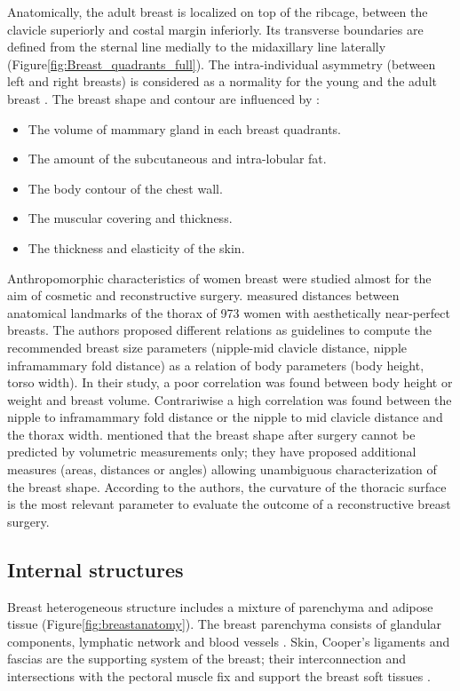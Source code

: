  Anatomically, the adult breast is localized on top of the ribcage, between the clavicle superiorly and costal margin inferiorly. Its transverse boundaries are defined from the sternal line medially to the midaxillary line laterally (Figure\ref{fig:Breast_quadrants_full}). The intra-individual asymmetry (between left and right breasts) is considered as a normality for the young and the adult breast . The breast shape and contour are influenced by \citep{mugea2014aesthetic}:
 \begin{itemize}
 \item The volume of mammary gland in each breast quadrants.
 \item The amount of the subcutaneous and intra-lobular fat.
 \item The body contour of the chest wall.
 \item The muscular covering and thickness.
 \item The thickness and elasticity of the skin.
 \end{itemize}

Anthropomorphic characteristics of women breast were studied almost for the aim of cosmetic and reconstructive surgery.  \cite{vandeput2002considerations} measured distances between anatomical landmarks of the thorax of 973 women with aesthetically near-perfect breasts. The authors proposed different relations as guidelines to compute the recommended breast size parameters (nipple-mid clavicle distance, nipple inframammary fold distance) as a relation of body parameters (body height, torso width). In their study, a poor correlation was found between body height or weight and breast volume. Contrariwise a high correlation was found between the nipple to  inframammary fold distance or the nipple to mid clavicle distance and the thorax width. \cite{catanuto2008experimental} mentioned that the breast shape after surgery cannot be predicted by volumetric measurements only; they have proposed additional measures (areas, distances or angles) allowing unambiguous characterization of the breast shape. According to the authors, the curvature of the thoracic surface is the most relevant parameter to evaluate the outcome of a reconstructive breast surgery.


\subsection{Internal structures}\label{subsection:internalstructures}

Breast heterogeneous structure includes a mixture of parenchyma and adipose tissue (Figure\ref{fig:breastanatomy}). The breast parenchyma consists of glandular components, lymphatic network and blood vessels \citep{clemente2011anatomy}. Skin, Cooper's ligaments and fascias are the supporting system of the breast; their interconnection and intersections with the pectoral muscle fix and support the breast soft tissues \citep{mugea2014aesthetic}.

